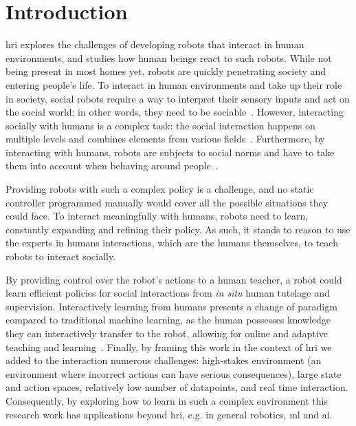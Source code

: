 \chapter{Introduction} \label{chap:intro}
\graphicspath{{images/intro/}}
\glsresetall

\gls{hri} explores the challenges of developing robots that interact in human environments, and studies how human beings react to such robots. While not being present in most homes yet, robots are quickly penetrating society and entering people's life. 
To interact in human environments and take up their role in society, social robots require a way to interpret their sensory inputs and act on the social world; in other words, they need to be sociable~\citep{breazeal2004designing}. However, interacting socially with humans is a complex task: the social interaction happens on multiple levels and combines elements from various fields~\citep{fong2003survey}. Furthermore, by interacting with humans, robots are subjects to social norms and have to take them into account when behaving around people~\citep{bartneck2004design}. 

Providing robots with such a complex policy is a challenge, and no static controller programmed manually would cover all the possible situations they could face. To interact meaningfully with humans, robots need to learn, constantly expanding and refining their policy. As such, it stands to reason to use the experts in humans interactions, which are the humans themselves, to teach robots to interact socially. 

By providing control over the robot's actions to a human teacher, a robot could learn efficient policies for social interactions from \textit{in situ} human tutelage and supervision. Interactively learning from humans presents a change of paradigm compared to traditional machine learning, as the human possesses knowledge they can interactively transfer to the robot, allowing for online and adaptive teaching and learning~\citep{fails2003interactive,amershi2014power}. Finally, by framing this work in the context of \gls{hri} we added to the interaction numerous challenges: high-stakes environment (an environment where incorrect actions can have serious consequences), large state and action spaces, relatively low number of datapoints, and real time interaction. Consequently, by exploring how to learn in such a complex environment this research work has applications beyond \gls{hri}, e.g. in general robotics, \gls{ml} and \gls{ai}.

